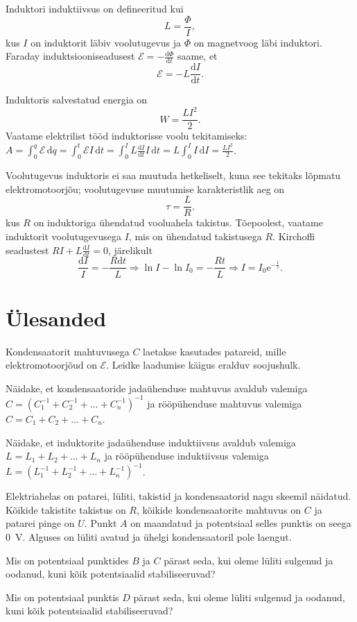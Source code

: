 \documentclass[a4paper,11pt,twocolumn]{article}
\begin{document}
Induktori induktiivsus on defineeritud kui
\[
L=\frac{\Phi}{I}
,\] kus $I$ on induktorit läbiv voolutugevus ja $\Phi$ on magnetvoog läbi induktori.
Faraday induktsiooniseadusest $\mathcal{E}= -\frac{\mathrm{d}\Phi}{\mathrm{d}t}$ saame, et
\[
\mathcal{E}=-L \frac{\mathrm{d}I}{\mathrm{d}t}
.\]

Induktoris salvestatud energia on
\[
W=\frac{LI^2}{2}
.\]
Vaatame elektrilist tööd induktorisse voolu tekitamiseks: $A=\int_0^{q}\mathcal{E}\, \mathrm{d}q=\int_0^{t} \mathcal{E} I \, \mathrm{d}t=\int_0^{I}L \frac{\mathrm{d}I}{\mathrm{d}t} I \, \mathrm{d}t = L \int_0^{I}I \, \mathrm{d}I=\frac{LI^2}{2}$.

Voolutugevus induktoris ei saa muutuda hetkeliselt, kuna see tekitaks lõpmatu elektromotoorjõu; voolutugevuse muutumise karakteristlik aeg on
\[
\tau=\frac{L}{R}
.\] kus $R$ on induktoriga ühendatud vooluahela takistus.
Tõepoolest, vaatame induktorit voolutugevusega $I$, mis on ühendatud takistusega $R$. Kirchoffi seadustest $RI+L \frac{\mathrm{d}I}{\mathrm{d}t}=0$, järelikult
\[
    \frac{\mathrm{d} I}{I}=-\frac{R \mathrm{d} t}{L} \Rightarrow \ln I-\ln I_{0}=-\frac{R t}{L} \Rightarrow I=I_{0} \mathrm{e}^{-\frac{t}{\tau}}
.\]

\section{Ülesanded}
\begin{question}
    Kondensaatorit mahtuvusega $C$ laetakse kasutades patareid, mille elektromotoorjõud on $\mathcal{E}$. Leidke laadumise käigus eralduv soojushulk.
\end{question}

\begin{question}
    Näidake, et kondensaatoride jadaühenduse mahtuvus avaldub valemiga $C=(C_1^{-1} + C_2^{-1} + \ldots + C_n^{-1})^{-1}$ ja rööpühenduse mahtuvus valemiga $C=C_1+C_2+\ldots + C_n$.
\end{question}

\begin{question}
    Näidake, et induktorite jadaühenduse induktiivsus avaldub valemiga $L=L_1+L_2+\ldots+L_n$ ja rööpühenduse induktiivsus valemiga $L=(L_1^{-1}+L_2^{-1}+\ldots+ L_n^{-1})^{-1}$.
\end{question}

\begin{question}[NBPhO 2017, P3][vv1][2.9cm]
    Elektriahelas on patarei, lüliti, takistid ja kondensaatorid nagu skeemil näidatud. Kõikide takistite takistus on $R$, kõikide kondensaatorite mahtuvus on $C$ ja patarei pinge on $U$. Punkt $A$ on maandatud ja potentsiaal selles punktis on seega \SI{0}{V}. Alguses on lüliti avatud ja ühelgi kondensaatoril pole laengut.
    \begin{subquestion}
    \item Mis on potentsiaal punktides $B$ ja $C$ pärast seda, kui oleme lüliti sulgenud ja oodanud, kuni kõik potentsiaalid stabiliseeruvad?
    \item  Mis on potentsiaal punktis $D$ pärast seda, kui oleme lüliti sulgenud ja oodanud, kuni kõik potentsiaalid stabiliseeruvad?
    \end{subquestion}
\end{question}
\end{document}
